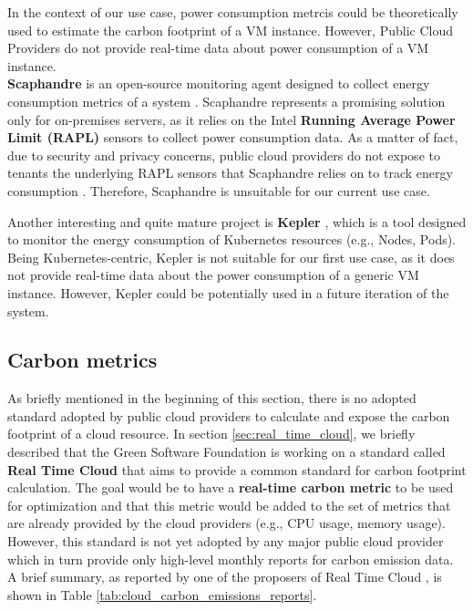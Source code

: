 In the context of our use case, power consumption metrcis could be theoretically used to estimate the carbon footprint of a VM instance.
However, Public Cloud Providers do not provide real-time data about power consumption of a VM instance. \\

\textbf{Scaphandre} is an open-source monitoring agent designed to collect energy consumption metrics of a system \cite{scaphandre}.
Scaphandre represents a promising solution only for on-premises servers, as it relies on the Intel \textbf{Running Average Power Limit (RAPL)} sensors to collect power consumption data.
As a matter of fact, due to security and privacy concerns, public cloud providers do not expose to tenants the underlying RAPL sensors that Scaphandre relies on to track energy consumption \cite{scaphandre_github_issue}.
Therefore, Scaphandre is unsuitable for our current use case.

Another interesting and quite mature project is \textbf{Kepler} \cite{kepler}, which is a tool designed to monitor the energy consumption of Kubernetes resources (e.g., Nodes, Pods).
Being Kubernetes-centric, Kepler is not suitable for our first use case, as it does not provide real-time data about the power consumption of a generic VM instance.
However, Kepler could be potentially used in a future iteration of the system.


\subsection{Carbon metrics}
\label{sec:carbon_metrics}

As briefly mentioned in the beginning of this section, there is no adopted standard adopted by public cloud providers to calculate and expose the carbon footprint of a cloud resource.
In section \ref{sec:real_time_cloud}, we briefly described that the Green Software Foundation is working on a standard called \textbf{Real Time Cloud} that aims to provide a common standard for carbon footprint calculation.
The goal would be to have a \textbf{real-time carbon metric} to be used for optimization and that this metric would be added to the set of metrics that are already provided by the cloud providers (e.g., CPU usage, memory usage).
However, this standard is not yet adopted by any major public cloud provider which in turn provide only high-level monthly reports for carbon emission data.
A brief summary, as reported by one of the proposers of Real Time Cloud \cite{cloud_provider_sustainability_reports}, is shown in Table \ref{tab:cloud_carbon_emissions_reports}.

